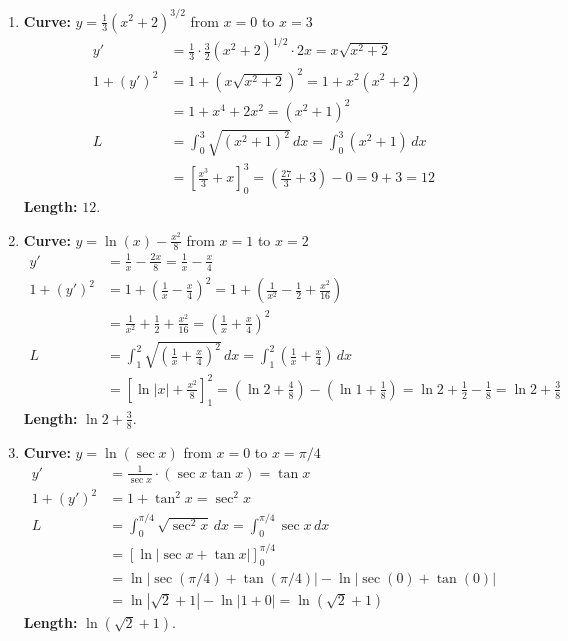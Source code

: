 \documentclass[12pt]{article}
\begin{document}
\begin{enumerate}[label=\alph*.]
    \item \textbf{Curve:} $y = \frac{1}{3}(x^2+2)^{3/2}$ from $x=0$ to $x=3$
    \begin{align*}
        y' &= \frac{1}{3} \cdot \frac{3}{2}(x^2+2)^{1/2} \cdot 2x = x\sqrt{x^2+2} \\
        1+(y')^2 &= 1 + (x\sqrt{x^2+2})^2 = 1 + x^2(x^2+2) \\
        &= 1 + x^4 + 2x^2 = (x^2+1)^2 \\
        L &= \int_{0}^{3} \sqrt{(x^2+1)^2} \,dx = \int_{0}^{3} (x^2+1) \,dx \\
        &= \left[ \frac{x^3}{3} + x \right]_{0}^{3} = \left(\frac{27}{3} + 3\right) - 0 = 9+3 = 12
    \end{align*}
    \textbf{Length:} $12$.

    \item \textbf{Curve:} $y = \ln(x) - \frac{x^2}{8}$ from $x=1$ to $x=2$
    \begin{align*}
        y' &= \frac{1}{x} - \frac{2x}{8} = \frac{1}{x} - \frac{x}{4} \\
        1+(y')^2 &= 1 + \left(\frac{1}{x} - \frac{x}{4}\right)^2 = 1 + \left(\frac{1}{x^2} - \frac{1}{2} + \frac{x^2}{16}\right) \\
        &= \frac{1}{x^2} + \frac{1}{2} + \frac{x^2}{16} = \left(\frac{1}{x} + \frac{x}{4}\right)^2 \\
        L &= \int_{1}^{2} \sqrt{\left(\frac{1}{x} + \frac{x}{4}\right)^2} \,dx = \int_{1}^{2} \left(\frac{1}{x} + \frac{x}{4}\right) \,dx \\
        &= \left[ \ln|x| + \frac{x^2}{8} \right]_{1}^{2} = \left(\ln 2 + \frac{4}{8}\right) - \left(\ln 1 + \frac{1}{8}\right) = \ln 2 + \frac{1}{2} - \frac{1}{8} = \ln 2 + \frac{3}{8}
    \end{align*}
    \textbf{Length:} $\ln 2 + \frac{3}{8}$.
    
    \item \textbf{Curve:} $y = \ln(\sec x)$ from $x=0$ to $x=\pi/4$
    \begin{align*}
        y' &= \frac{1}{\sec x} \cdot (\sec x \tan x) = \tan x \\
        1+(y')^2 &= 1 + \tan^2 x = \sec^2 x \\
        L &= \int_{0}^{\pi/4} \sqrt{\sec^2 x} \,dx = \int_{0}^{\pi/4} \sec x \,dx \\
        &= \left[ \ln|\sec x + \tan x| \right]_{0}^{\pi/4} \\
        &= \ln|\sec(\pi/4) + \tan(\pi/4)| - \ln|\sec(0) + \tan(0)| \\
        &= \ln|\sqrt{2} + 1| - \ln|1+0| = \ln(\sqrt{2}+1)
    \end{align*}
    \textbf{Length:} $\ln(\sqrt{2}+1)$.
\end{enumerate}
\end{document}
